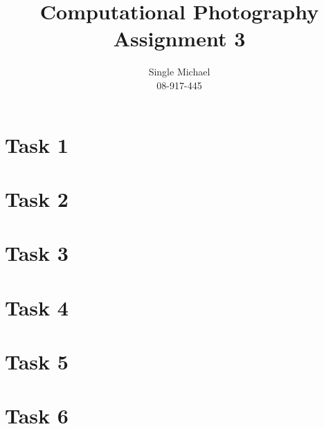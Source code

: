 \documentclass{paper}
\title{Computational Photography Assignment 3}
\author{Single Michael\\08-917-445}
\begin{document}
\maketitle


\section{Task 1}
\section{Task 2}
\section{Task 3}
\section{Task 4}
\section{Task 5}
\section{Task 6}
\end{document}

